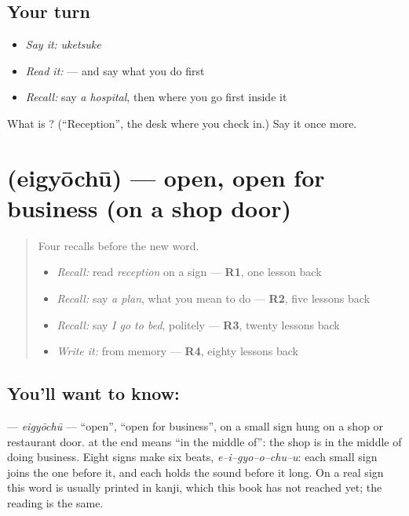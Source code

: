 \subsection*{Your turn}
\begin{itemize}
\raggedright
  \item \emph{Say it:} \emph{uketsuke}
  \item \emph{Read it:} \textbf{   } — and say what you do first
  \item \emph{Recall:} say \emph{a hospital}, then where you go first inside it
\end{itemize}

\begin{tcolorbox}[breakable,colback=teal!4,colframe=teal!35!black,title={Before you move on}]
What is ? (\textquotedblleft{}Reception\textquotedblright{}, the desk where you check in.) Say it once more.
\end{tcolorbox}
\section[\texorpdfstring{\ja{えいぎょうちゅう} (eigyōchū)}{えいぎょうちゅう (eigyōchū)}]{ (eigyōchū) — open, open for business (on a shop door)}

\label{lesson:JA-C142-eigyouchuu}



\begin{quote}
Four recalls before the new word.

\begin{itemize}
\raggedright
  \item \emph{Recall:} read \emph{reception} on a sign — \textbf{R1}, one lesson back
  \item \emph{Recall:} say \emph{a plan}, what you mean to do — \textbf{R2}, five lessons back
  \item \emph{Recall:} say \emph{I go to bed}, politely — \textbf{R3}, twenty lessons back
  \item \emph{Write it:} \textbf{} from memory — \textbf{R4}, eighty lessons back
\end{itemize}
\end{quote}

\subsection*{You'll want to know: }
\textbf{} — \emph{eigyōchū} — \textquotedblleft{}open\textquotedblright{}, \textquotedblleft{}open for business\textquotedblright{}, on a small sign hung on a shop or restaurant door. \textbf{} at the end means \textquotedblleft{}in the middle of\textquotedblright{}: the shop is in the middle of doing business. Eight signs make six beats, \emph{e–i–gyo–o–chu–u}: each small sign joins the one before it, and each \textbf{} holds the sound before it long. On a real sign this word is usually printed in kanji, which this book has not reached yet; the reading is the same.


